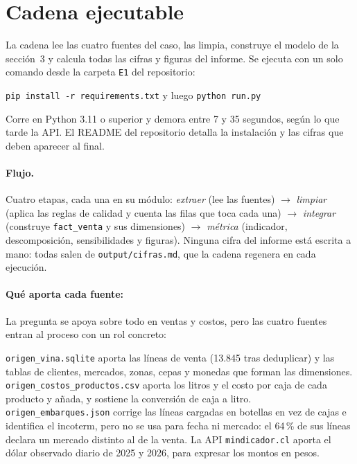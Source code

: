 

\section{Cadena ejecutable}

La cadena lee las cuatro fuentes del caso, las limpia, construye el modelo de la sección~3 y calcula todas las cifras y figuras del informe. Se ejecuta con un solo comando desde la carpeta \texttt{E1} del repositorio:

\begin{center}
\texttt{pip install -r requirements.txt} \quad y luego \quad \texttt{python run.py}
\end{center}

\noindent Corre en Python 3.11 o superior y demora entre 7 y 35 segundos, según lo que tarde la API. El README del repositorio detalla la instalación y las cifras que deben aparecer al final.

\paragraph{Flujo.} Cuatro etapas, cada una en su módulo: \emph{extraer} (lee las fuentes) $\rightarrow$ \emph{limpiar} (aplica las reglas de calidad y cuenta las filas que toca cada una) $\rightarrow$ \emph{integrar} (construye \texttt{fact\_venta} y sus dimensiones) $\rightarrow$ \emph{métrica} (indicador, descomposición, sensibilidades y figuras). Ninguna cifra del informe está escrita a mano: todas salen de \texttt{output/cifras.md}, que la cadena regenera en cada ejecución.

\paragraph{Qué aporta cada fuente:}La pregunta se apoya sobre todo en ventas y costos, pero las cuatro fuentes entran al proceso con un rol concreto:

\texttt{origen\_vina.sqlite} aporta las líneas de venta (13.845 tras deduplicar) y las tablas de clientes, mercados, zonas, cepas y monedas que forman las dimensiones. \texttt{origen\_costos\_productos.csv} aporta los litros y el costo por caja de cada producto y añada, y sostiene la conversión de caja a litro. \texttt{origen\_embarques.json} corrige las líneas cargadas en botellas en vez de cajas e identifica el incoterm, pero no se usa para fecha ni mercado: el 64\,\% de sus líneas declara un mercado distinto al de la venta. La API \texttt{mindicador.cl} aporta el dólar observado diario de 2025 y 2026, para expresar los montos en pesos.

